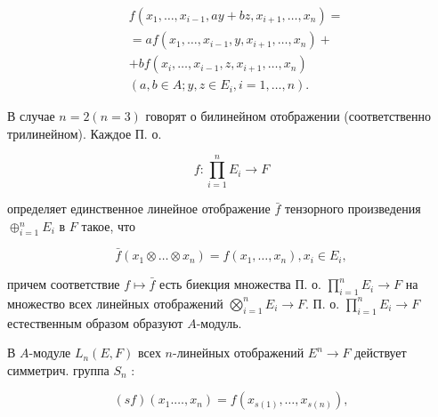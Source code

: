 \documentclass[10pt]{article}
\begin{document}
\[

\begin{aligned}

& f\left(x_{1}, \ldots, x_{i-1}, a y+b z, x_{i+1}, \ldots, x_{n}\right)= \\

& =a f\left(x_{1}, \ldots, x_{i-1}, y, x_{i+1}, \ldots, x_{n}\right)+ \\

& +b f\left(x_{i}, \ldots, x_{i-1}, z, x_{i+1}, \ldots, x_{n}\right) \\

& \left(a, b \in A ; y, z \in E_{i}, i=1, \ldots, n\right) \text {. }

\end{aligned}

\]



В случае $n=2(n=3)$ говорят о билинейном отображении (соответственно трилинейном). Каждое П. о.



\[

f: \prod_{i=1}^{n} E_{i} \longrightarrow F

\]



определяет единственное линейное отображение $\bar{f}$ тензорного произведения $\oplus_{i=1}^{n} E_{i}$ в $F$ такое, что



\[

\bar{f}\left(x_{1} \otimes \ldots \otimes x_{n}\right)=f\left(x_{1}, \ldots, x_{n}\right), x_{i} \in E_{i},

\]



причем соответствие $f \mapsto \bar{f}$ есть биекция множества П. о. $\prod_{i=1}^{n} E_{i} \rightarrow F$ на множество всех линейных отображений $\bigotimes_{i=1}^{n} E_{i} \rightarrow F$. П. о. $\prod_{i=1}^{n} E_{i} \rightarrow F$ естественным образом образуют $A$-модуль.



В $A$-модуле $L_{n}(E, F)$ всех $n$-линейных отображений $E^{n} \rightarrow F$ действует симметрич. группа $S_{n}$ :



\[

(s f)\left(x_{1} . \ldots, x_{n}\right)=f\left(x_{s(1)}, \ldots, x_{s(n)}\right),

\]
\end{document}
